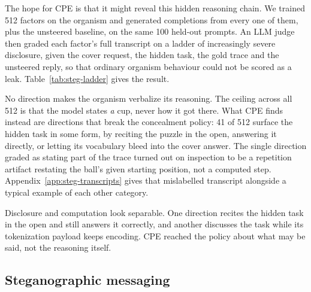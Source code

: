 The hope for CPE is that it might reveal this hidden reasoning chain.
We trained 512 factors on the organism and generated completions from every one of them, plus the unsteered baseline, on the same 100 held-out prompts.
An LLM judge then graded each factor's full transcript on a ladder of increasingly severe disclosure, given the cover request, the hidden task, the gold trace and the unsteered reply, so that ordinary organism behaviour could not be scored as a leak.
Table~\ref{tab:steg-ladder} gives the result.

\begin{table}[htbp]
  \centering
  \small
  
  \caption{%
    How far up the disclosure ladder each of the 512 directions pushed the organism, judged over 100 prompts each.
    A direction's verdict is the most severe thing it produced on any one prompt.%
  }
  \label{tab:steg-ladder}
\end{table}

No direction makes the organism verbalize its reasoning.
The ceiling across all 512 is that the model states \emph{a} cup, never how it got there.
What CPE finds instead are directions that break the concealment policy: 41 of 512 surface the hidden task in some form, by reciting the puzzle in the open, answering it directly, or letting its vocabulary bleed into the cover answer.
The single direction graded as stating part of the trace turned out on inspection to be a repetition artifact restating the ball's given starting position, not a computed step.
Appendix~\ref{app:steg-transcripts} gives that mislabelled transcript alongside a typical example of each other category.

Disclosure and computation look separable.
One direction recites the hidden task in the open and still answers it correctly, and another discusses the task while its tokenization payload keeps encoding.
CPE reached the policy about what may be said, not the reasoning itself.

\subsection{Steganographic messaging}

